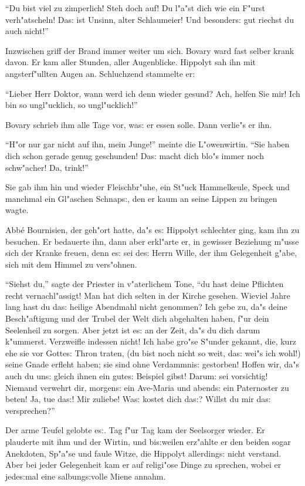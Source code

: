 \documentclass[oneside,12pt]{book}
\newcommand{\s}{s:}%
\begin{document}
"`Du bist viel zu zimperlich! Steh doch auf! Du l"a"st dich wie
ein F"urst verh"atscheln! Da{\s} ist Unsinn, alter Schlaumeier!
Und besonder{\s} gut riechst du auch nicht!"'

Inzwischen griff der Brand immer weiter um sich. Bovary ward fast
selber krank davon. Er kam aller Stunden, aller Augenblicke.
Hippolyt sah ihn mit angsterf"ullten Augen an. Schluchzend
stammelte er:

"`Lieber Herr Doktor, wann werd ich denn wieder gesund? Ach,
helfen Sie mir! Ich bin so ungl"ucklich, so ungl"ucklich!"'

Bovary schrieb ihm alle Tage vor, wa{\s} er essen solle. Dann
verlie"s er ihn.

"`H"or nur gar nicht auf ihn, mein Junge!"' meinte die
L"owenwirtin. "`Sie haben dich schon gerade genug geschunden!
Da{\s} macht dich blo"s immer noch schw"acher! Da, trink!"'

Sie gab ihm hin und wieder Fleischbr"uhe, ein St"uck Hammelkeule,
Speck und manchmal ein Gl"aschen Schnap{\s}, den er kaum an seine
Lippen zu bringen wagte.

Abb\'e Bournisien, der geh"ort hatte, da"s e{\s} Hippolyt
schlechter ging, kam ihn zu besuchen. Er bedauerte ihn, dann aber
erkl"arte er, in gewisser Beziehung m"usse sich der Kranke freuen,
denn e{\s} sei de{\s} Herrn Wille, der ihm Gelegenheit g"abe, sich
mit dem Himmel zu vers"ohnen.

"`Siehst du,"' sagte der Priester in v"aterlichem Tone, "`du hast
deine Pflichten recht vernachl"assigt! Man hat dich selten in der
Kirche gesehen. Wieviel Jahre lang hast du da{\s} heilige
Abendmahl nicht genommen? Ich gebe zu, da"s deine Besch"aftigung
und der Trubel der Welt dich abgehalten haben, f"ur dein
Seelenheil zu sorgen. Aber jetzt ist e{\s} an der Zeit, da"s du
dich darum k"ummerst. Verzweifle indessen nicht! Ich habe gro"se
S"under gekannt, die, kurz ehe sie vor Gotte{\s} Thron traten, (du
bist noch nicht so weit, da{\s} wei"s ich wohl!) seine Gnade
erfleht haben; sie sind ohne Verdammni{\s} gestorben! Hoffen wir,
da"s auch du un{\s} gleich ihnen ein gute{\s} Beispiel gibst!
Darum: sei vorsichtig! Niemand verwehrt dir, morgen{\s} ein
Ave-Maria und abend{\s} ein Paternoster zu beten! Ja, tue da{\s}!
Mir zuliebe! Wa{\s} kostet dich da{\s}? Willst du mir da{\s}
versprechen?"'

Der arme Teufel gelobte e{\s}. Tag f"ur Tag kam der Seelsorger
wieder. Er plauderte mit ihm und der Wirtin, und bi{\s}weilen
erz"ahlte er den beiden sogar Anekdoten, Sp"a"se und faule Witze,
die Hippolyt allerding{\s} nicht verstand. Aber bei jeder
Gelegenheit kam er auf religi"ose Dinge zu sprechen, wobei er
jede{\s}mal eine salbung{\s}volle Miene annahm.
\end{document}
